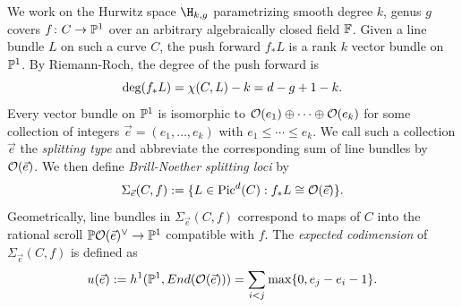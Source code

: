 We work on the Hurwitz space $\H_{k,g}$ parametrizing smooth degree $k$, genus $g$ covers $f\colon  C \rightarrow \mathbb{P}^1$ over an arbitrary algebraically closed field $\mathbb{F}$.
Given a line bundle $L$ on such a curve $C$, the push forward $f_* L$ is a rank $k$ vector bundle on $\mathbb{P}^1$.
By Riemann-Roch, the degree of the push forward is
\begin{equation} \label{rr}\dcref{1.2}
\source{refined-brill-noether-theory-hurwitz-spaces}
\deg(f_*L) = \chi(C, L) - k = d - g + 1 - k.
\end{equation}
Every vector bundle on $\mathbb{P}^1$ is isomorphic to $\mathcal{O}(e_1) \oplus \cdots \oplus \mathcal{O}(e_k)$ for some collection of integers $\vec{e} = (e_1, \ldots, e_k)$ with $e_1 \leq \cdots \leq e_k$.
We call such a collection $\vec{e}$ the \textit{splitting type} and abbreviate the corresponding sum of line bundles by $\mathcal{O}(\vec{e})$.
We then define \textit{Brill-Noether splitting loci} by
\[\Sigma_{\vec{e}}(C, f) := \{L \in \operatorname{Pic}^d(C) : f_*L \cong \mathcal{O}(\vec{e})\}. \]
Geometrically, line bundles in $\Sigma_{\vec{e}}(C, f)$ correspond to maps of $C$ into the rational scroll $\mathbb{P} \mathcal{O}(\vec{e})^\vee \rightarrow \mathbb{P}^1$ compatible with $f$.
The \textit{expected codimension} of $\Sigma_{\vec{e}}(C, f)$ is defined as
\[u(\vec{e}) := h^1(\mathbb{P}^1, End(\mathcal{O}(\vec{e}))) = \sum_{i < j} \max \{0, e_j - e_i - 1\}.\]

